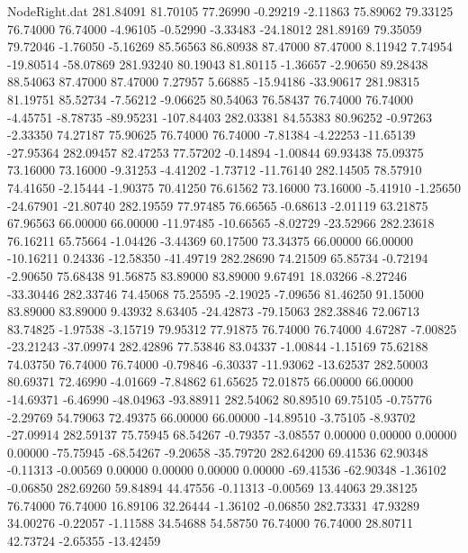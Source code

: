 \begin{filecontents}{NodeRight.dat}
 281.84091   81.70105   77.26990    -0.29219   -2.11863   75.89062   79.33125   76.74000   76.74000   -4.96105   -0.52990   -3.33483  -24.18012
 281.89169   79.35059   79.72046    -1.76050   -5.16269   85.56563   86.80938   87.47000   87.47000    8.11942    7.74954  -19.80514  -58.07869
 281.93240   80.19043   81.80115    -1.36657   -2.90650   89.28438   88.54063   87.47000   87.47000    7.27957    5.66885  -15.94186  -33.90617
 281.98315   81.19751   85.52734    -7.56212   -9.06625   80.54063   76.58437   76.74000   76.74000   -4.45751   -8.78735  -89.95231 -107.84403
 282.03381   84.55383   80.96252    -0.97263   -2.33350   74.27187   75.90625   76.74000   76.74000   -7.81384   -4.22253  -11.65139  -27.95364
 282.09457   82.47253   77.57202    -0.14894   -1.00844   69.93438   75.09375   73.16000   73.16000   -9.31253   -4.41202   -1.73712  -11.76140
 282.14505   78.57910   74.41650    -2.15444   -1.90375   70.41250   76.61562   73.16000   73.16000   -5.41910   -1.25650  -24.67901  -21.80740
 282.19559   77.97485   76.66565    -0.68613   -2.01119   63.21875   67.96563   66.00000   66.00000  -11.97485  -10.66565   -8.02729  -23.52966
 282.23618   76.16211   65.75664    -1.04426   -3.44369   60.17500   73.34375   66.00000   66.00000  -10.16211    0.24336  -12.58350  -41.49719
 282.28690   74.21509   65.85734    -0.72194   -2.90650   75.68438   91.56875   83.89000   83.89000    9.67491   18.03266   -8.27246  -33.30446
 282.33746   74.45068   75.25595    -2.19025   -7.09656   81.46250   91.15000   83.89000   83.89000    9.43932    8.63405  -24.42873  -79.15063
 282.38846   72.06713   83.74825    -1.97538   -3.15719   79.95312   77.91875   76.74000   76.74000    4.67287   -7.00825  -23.21243  -37.09974
 282.42896   77.53846   83.04337    -1.00844   -1.15169   75.62188   74.03750   76.74000   76.74000   -0.79846   -6.30337  -11.93062  -13.62537
 282.50003   80.69371   72.46990    -4.01669   -7.84862   61.65625   72.01875   66.00000   66.00000  -14.69371   -6.46990  -48.04963  -93.88911
 282.54062   80.89510   69.75105    -0.75776   -2.29769   54.79063   72.49375   66.00000   66.00000  -14.89510   -3.75105   -8.93702  -27.09914
 282.59137   75.75945   68.54267    -0.79357   -3.08557    0.00000    0.00000    0.00000    0.00000  -75.75945  -68.54267   -9.20658  -35.79720
 282.64200   69.41536   62.90348    -0.11313   -0.00569    0.00000    0.00000    0.00000    0.00000  -69.41536  -62.90348   -1.36102   -0.06850
 282.69260   59.84894   44.47556    -0.11313   -0.00569   13.44063   29.38125   76.74000   76.74000   16.89106   32.26444   -1.36102   -0.06850
 282.73331   47.93289   34.00276    -0.22057   -1.11588   34.54688   54.58750   76.74000   76.74000   28.80711   42.73724   -2.65355  -13.42459

\end{filecontents}
